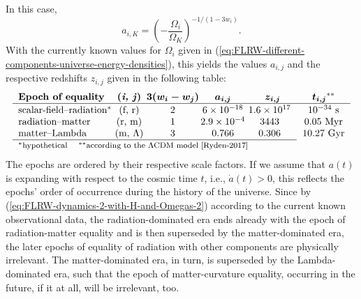 In this case,
\begin{equation}
	a_{i,K}
	= \left(-\frac{\Omega_{i}}{\Omega_{K}}\right)^{-1/(1-3w_i)}
	.
\end{equation}
With the currently known values for $\Omega_i$ given in (\ref{eq:FLRW-different-components-universe-energy-densities}), this yields the values $a_{i,j}$ and the respective redshifts $z_{i,j}$ given in the following table: \cite[cf.][96]{Ryden-2017}
\begin{equation}
\begin{tabular}{l@{\ }c@{\ }c@{\,}c@{\ }cc}
	\textbf{Epoch of equality} & \textbf{(\textit{i, j})} & 
	$\fett{3(w_i - w_j)}$ & $\fett{a_{i,j}}$ 
	& \multicolumn{1}{c}{$\fett{z_{i,j}}$}
	& $\fett{t_{i,j}}^{**}$
	\\ \hline
	\\ [-2.5ex]
	scalar-field--radiation$^{*}$ & (f, r) & 2 & $6 \times 10^{-18}$ 
	& {$1.6 \times 10^{17}$}
	& $10^{-34}$ s
	\\
	radiation--matter & (r, m) & 1 & $2.9 \times 10^{-4}$ 
	& {3443} %
	& 0.05 Myr
	\\
	matter--Lambda & (m, $\Lambda$) & 3 & 0.766 & 0.306 %
	& 10.27 Gyr
	\\ \cline{1-5}
	\multicolumn{6}{l}{\footnotesize 
		$^{*}$hypothetical
		\quad
		$^{**}$according to the $\Lambda$CDM model \cite[92,95,195]{Ryden-2017}
	}
\end{tabular}
\label{eq:epochs-of-equality}
\end{equation}
The epochs are ordered by their respective scale factors. If we assume that $a(t)$ is expanding with respect to the cosmic time $t$, i.e., $\dot{a}(t) > 0$, this reflects the epochs' order of occurrence during the history of the universe.
Since by (\ref{eq:FLRW-dynamics-2-with-H-and-Omegas-2}) according to the current known observational data, the radiation-dominated era ends already with the epoch of radiation-matter equality and is then superseded by the matter-dominated era, the later epochs of equality of radiation with other components are physically irrelevant. The matter-dominated era, in turn, is superseded by the Lambda-dominated era, such that the epoch of matter-curvature equality, occurring in the future, if it at all, will be irrelevant, too.

